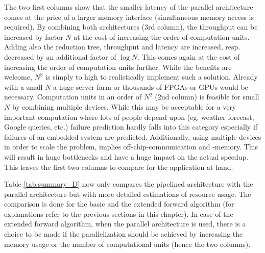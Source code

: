 \documentclass[mscthesis]{usiinfthesis}
\begin{document}
The two first columns show that the smaller latency of the parallel architecture
comes at the price of a larger memory interface (simultaneous memory access
is required). By combining both architectures (3rd column), the throughput can
be increased by factor $N$ at the cost of increasing the order of computation
units. Adding also the reduction tree, throughput and latency are increased, 
resp. decreased by an additional factor of $\log N$. This comes again at the
cost of increasing the order of computation units further. While the benefits
are welcome, $N^3$ is simply to high to realistically implement such a solution.
Already with a small $N$ a huge server farm or thousands of FPGAs or GPUs would
be necessary. Computation units in an order of $N^2$ (2nd column) is feasible
for small $N$ by combining multiple devices. While this may be acceptable for
a very important computation where lots of people depend upon (eg. weather
forecast, Google queries, etc.) failure prediction hardly falls into this
category especially if failures of an embedded system are predicted.
Additionally, using multiple devices in order to scale the problem, implies
off-chip-communication and -memory. This will result in huge bottlenecks and
have a huge impact on the actual speedup. This leaves the first two columns to
compare for the application at hand.

Table \ref{tab:summary_D} now only compares the pipelined architecture with the
parallel architecture but with more detailed estimations of resource usage.
The comparison is done for the basic and the extended forward algorithm (for
explanations refer to the previous sections in this chapter). In case of the
extended forward algorithm, when the parallel architecture is used, there is
a choice to be made if the parallelization should be achieved by increasing the
memory usage or the number of computational units (hence the two columns).
\end{document}
